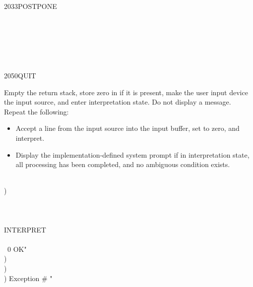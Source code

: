 \begin{worddef}{2033}{POSTPONE}
	\begin{testing} %
		 \\
		 \\

		 \\
		 \\
	\end{testing}
\end{worddef}

\vspace*{-1ex}\enlargethispage{8ex}
\begin{worddef}{2050}{QUIT}
\item \stack{}{}

	Empty the return stack, store zero in  if it is
	present, make the user input device the input source, and enter
	interpretation state. Do not display a message. Repeat the
	following:

	\begin{itemize}
	\item Accept a line from the input source into the input buffer,
		set  to zero, and interpret.
	\item Display the implementation-defined system prompt if in
		interpretation state, all processing has been completed,
		and no ambiguous condition exists.
	\end{itemize}


	\begin{implement} %
		\word{:}  \\
		\tab {}  ) \\
		\tab {} \word{[} \\
		\tab[2]  \\
		\tab {} \\
		\tab[2] \word{[']} INTERPRET  \\
		\tab[2]  \\
		\tab[2] ~0     
			 OK"    \\
		    )  \\
		    )  \\
		\tab[2]   )   Exception \# "  \\
		\tab[2]  \\
		\tab {}  \\
		\word{;}


\end{implement}
\end{worddef}
